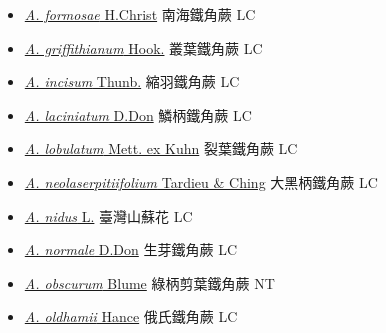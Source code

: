 \begin{itemize}
\begin{itemize}
        \item[] \href{http://www.theplantlist.org/tpl1.1/search?q=Asplenium+formosae}{\textit{A. formosae} H.Christ}   南海鐵角蕨   LC
        \item[] \href{http://www.theplantlist.org/tpl1.1/search?q=Asplenium+griffithianum}{\textit{A. griffithianum} Hook.}   叢葉鐵角蕨   LC
        \item[] \href{http://www.theplantlist.org/tpl1.1/search?q=Asplenium+incisum}{\textit{A. incisum} Thunb.}   縮羽鐵角蕨   LC
        \item[] \href{http://www.theplantlist.org/tpl1.1/search?q=Asplenium+laciniatum}{\textit{A. laciniatum} D.Don}   鱗柄鐵角蕨   LC
        \item[] \href{http://www.theplantlist.org/tpl1.1/search?q=Asplenium+lobulatum}{\textit{A. lobulatum} Mett. ex Kuhn}   裂葉鐵角蕨   LC
        \item[] \href{http://www.theplantlist.org/tpl1.1/search?q=Asplenium+neolaserpitiifolium}{\textit{A. neolaserpitiifolium} Tardieu \& Ching}   大黑柄鐵角蕨   LC
        \item[] \href{http://www.theplantlist.org/tpl1.1/search?q=Asplenium+nidus}{\textit{A. nidus} L.}   臺灣山蘇花   LC
        \item[] \href{http://www.theplantlist.org/tpl1.1/search?q=Asplenium+normale}{\textit{A. normale} D.Don}   生芽鐵角蕨   LC
        \item[] \href{http://www.theplantlist.org/tpl1.1/search?q=Asplenium+obscurum}{\textit{A. obscurum} Blume}   綠柄剪葉鐵角蕨   NT
        \item[] \href{http://www.theplantlist.org/tpl1.1/search?q=Asplenium+oldhamii}{\textit{A. oldhamii} Hance}   俄氏鐵角蕨   LC

\end{itemize}
\end{itemize}
